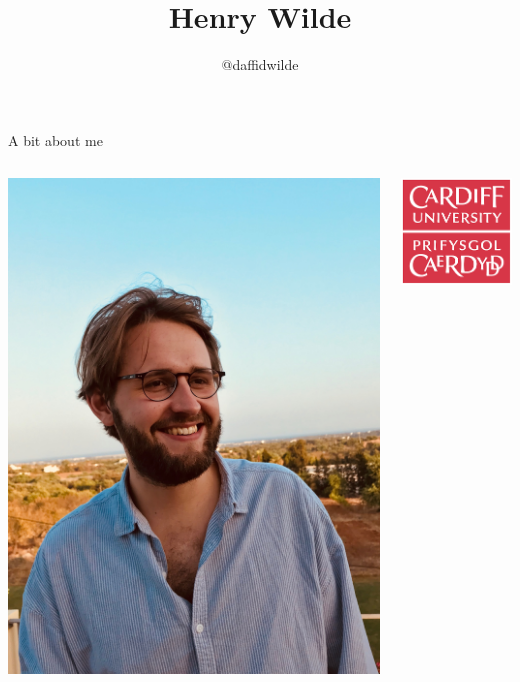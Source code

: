 \documentclass{beamer}
\title{\Huge Henry Wilde}
\author{\huge @daffidwilde}
\date{}
\begin{document}
\frame{\titlepage}
\graphicspath{{./static/}}


\begin{frame}{A bit about me}

    \begin{columns}[T]
        \begin{column}{.5\textwidth}
            \centering
            \includegraphics[width=.9\linewidth]{sun.jpg}
        \end{column}%
        \begin{column}{.5\textwidth}
            \centering
            \includegraphics[width=.5\linewidth]{cu_logo.png}\\

\end{column}
\end{columns}
\end{frame}
\end{document}
